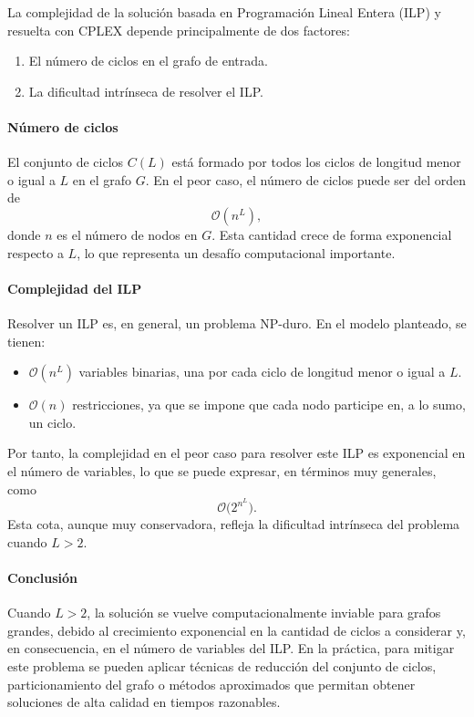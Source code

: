 \documentclass[twocolumn, fontsize=10pt]{article}
\begin{document}
La complejidad de la solución basada en Programación Lineal Entera (ILP) y resuelta con CPLEX depende principalmente de dos factores:
\begin{enumerate}
    \item El número de ciclos en el grafo de entrada.
    \item La dificultad intrínseca de resolver el ILP.
\end{enumerate}

\paragraph{Número de ciclos} 
El conjunto de ciclos \( C(L) \) está formado por todos los ciclos de longitud menor o igual a \( L \) en el grafo \( G \). En el peor caso, el número de ciclos puede ser del orden de 
\[
\mathcal{O}(n^L),
\]
donde \( n \) es el número de nodos en \( G \). Esta cantidad crece de forma exponencial respecto a \( L \), lo que representa un desafío computacional importante.

\paragraph{Complejidad del ILP}
Resolver un ILP es, en general, un problema NP-duro. En el modelo planteado, se tienen:
\begin{itemize}
    \item \(\mathcal{O}(n^L)\) variables binarias, una por cada ciclo de longitud menor o igual a \( L \).
    \item \(\mathcal{O}(n)\) restricciones, ya que se impone que cada nodo participe en, a lo sumo, un ciclo.
\end{itemize}
Por tanto, la complejidad en el peor caso para resolver este ILP es exponencial en el número de variables, lo que se puede expresar, en términos muy generales, como 
\[
\mathcal{O}\bigl(2^{n^L}\bigr).
\]
Esta cota, aunque muy conservadora, refleja la dificultad intrínseca del problema cuando \( L > 2 \).

\paragraph{Conclusión}
Cuando \( L > 2 \), la solución se vuelve computacionalmente inviable para grafos grandes, debido al crecimiento exponencial en la cantidad de ciclos a considerar y, en consecuencia, en el número de variables del ILP. En la práctica, para mitigar este problema se pueden aplicar técnicas de reducción del conjunto de ciclos, particionamiento del grafo o métodos aproximados que permitan obtener soluciones de alta calidad en tiempos razonables.
\end{document}

